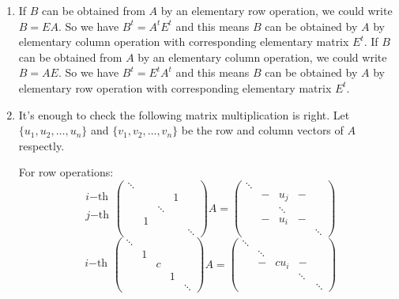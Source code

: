 \begin{enumerate}
\item If $B$ can be obtained from $A$ by an elementary row operation, we could write $B=EA$. So we have $B^t=A^tE^t$ and this means $B$ can be obtained by $A$ by elementary column operation with corresponding elementary matrix $E^t$. If $B$ can be obtained from $A$ by an elementary column operation, we could write $B=AE$. So we have $B^t=E^tA^t$ and this means $B$ can be obtained by $A$ by elementary row operation with corresponding elementary matrix $E^t$.
\item It's enough to check the following matrix multiplication is right. Let $\{u_1,u_2,\ldots ,u_n\}$ and $\{v_1,v_2,\ldots ,v_n\}$ be the row and column vectors of $A$ respectly.

For row operations:
\[\left.\begin{array}{c} \\i\mathrm{-th}\\ \\j\mathrm{-th} \\ \\\end{array}\right.\left(\begin{array}{ccccc}\ddots&&&& \\&&&1& \\&&\ddots && \\&1&&& \\&&&&\ddots \end{array}\right)A=\left(\begin{array}{ccccc}\ddots&&&& \\&-&u_j&-& \\&&\ddots && \\&-&u_i&-& \\&&&&\ddots \end{array}\right)\]
\[\left.\begin{array}{c} \\ \\i\mathrm{-th} \\ \\ \\\end{array}\right.\left(\begin{array}{ccccc}\ddots&&&& \\&1&&& \\&&c && \\&&&1& \\&&&&\ddots \end{array}\right)A=\left(\begin{array}{ccccc}\ddots&&&& \\&\ddots&&& \\&-&cu_i &-& \\&&&\ddots& \\&&&&\ddots \end{array}\right)\]

\end{enumerate}
